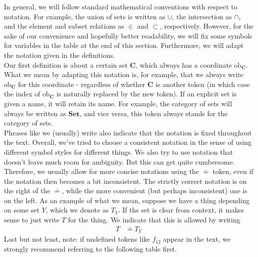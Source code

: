 In general, we will follow standard mathematical conventions with respect to notation.
For example, the union of sets is written as $\cup$, the intersection as $\cap$, and the element and subset relations as $\in$ and $\subset$, respectively.
However, for the sake of our convenience and hopefully better readability, we will fix some symbols for variables in the table at the end of this section.
Furthermore, we will adapt the notation given in the definitions.
\\
Our first definition is about a certain set $\mathbf{C}$, which always has a coordinate $\mathrm{ob}_{\mathbf{C}}$.
What we mean by adapting this notation is, for example, that we always write $\mathrm{ob}_{\mathbf{C}}$ for this coordinate - regardless of whether $\mathbf{C}$ is another token (in which case the index of $\mathrm{ob}_{\mathbf{C}}$ is naturally replaced by the new token).
If an explicit set is given a name, it will retain its name.
For example, the category of sets will always be written as $\mathbf{Set}$, and vice versa, this token always stands for the category of sets.
\\
Phrases like {\glqq}we (usually) write{\grqq} also indicate that the notation is fixed throughout the text.
Overall, we've tried to choose a consistent notation in the sense of using {\glqq}different symbol styles for different things{\grqq}.
We also try to use notation that doesn't leave much room for ambiguity.
But this can get quite cumbersome.
Therefore, we usually allow for more concise notations using the $\doteq$ token, even if the notation then becomes a bit inconsistent.
The strictly correct notation is on the right of the $\doteq$, while the more convenient (but perhaps inconsistent) one is on the left.
As an example of what we mean, suppose we have a thing depending on some set $Y$, which we denote as $T_{Y}$.
If the set is clear from context, it makes sense to just write $T$ for the thing.
We indicate that this is allowed by writing
\begin{align*}
  T
  &\doteq
  T_{Y}
\end{align*}
Last but not least, note: if undefined tokens like $f_{12}$ appear in the text, we strongly recommend referring to the following table first.
